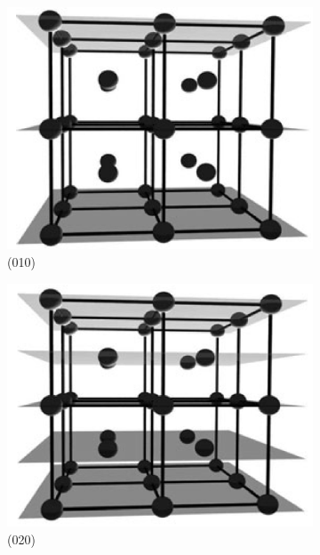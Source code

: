 \begin{figure}[h!] \centering
	\begin{subfigure}{0.3\linewidth} \centering
		\includegraphics[scale=0.22]{Cuerpo/Ch_02/010-bcc.png}
		\caption{(010)}
	\end{subfigure}
	\begin{subfigure}{0.3\linewidth} \centering
		\includegraphics[scale=0.21]{Cuerpo/Ch_02/020-bcc.png}
		\caption{(020)}
	\end{subfigure}
	\begin{subfigure}{0.3\linewidth} \centering

\end{subfigure}
\end{figure}
